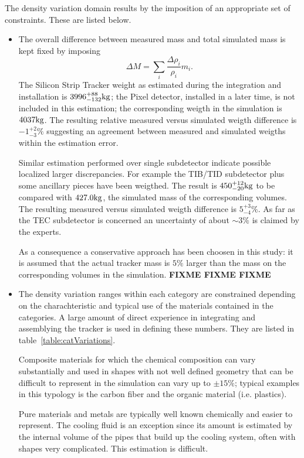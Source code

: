 \documentclass{cmspaper}
\begin{document}
The density variation domain results by the imposition of an appropriate set of constraints. These are listed below.
\begin{itemize}
%
\item The overall difference between measured mass and total simulated mass is kept fixed by imposing
 \begin{equation}
\Delta M = \sum_i \frac{\Delta \rho_i}{\rho_i} m_i.
\end{equation}
The Silicon Strip Tracker weight as estimated during the integration and installation is $3996^{+88}_{-132}\rm kg$; the Pixel detector, installed in a later time, is not included in this estimation; the corresponding weigth in the simulation is $4037\rm kg$. The resulting relative measured versus simulated weigth difference is $-1^{+2}_{-3}\%$ suggesting an agreement between measured and simulated weigths within the estimation error.


Similar estimation performed over single subdetector indicate possible localized larger discrepancies. For example the TIB/TID subdetector plus some ancillary pieces have been weigthed. The result is $450^{+12}_{-20}\rm kg$ to be compared with $427.0\rm kg$, the simulated mass of the corresponding volumes. The resulting measured versus simulated weigth difference is $5^{+3}_{-4}\%$. As far as the TEC subdetector is concerned an uncertainty of about $\sim 3\%$ is claimed by the experts.

As a consequence a conservative approach has been choosen in this study: it is assumed that the actual tracker mass is $5\%$ larger than the mass on the corresponding volumes in the simulation. {\bf FIXME FIXME FIXME}
\item The density variation ranges within each category are constrained depending on the charachteristic and typical use of the materials contained in the categories. A large amount of direct experience in integrating and assemblying the tracker is used in defining these numbers. They are listed in table~\ref{table:catVariations}.

Composite materials for which the chemical composition can vary substantially and used in shapes with not well defined geometry that can be difficult to represent in the simulation can vary up to $\pm 15\%$; typical examples in this typology is the carbon fiber and the organic material (i.e. plastics).

Pure materials and metals are typically well known chemically and easier to represent. The cooling fluid is an exception since its amount is estimated by the internal volume of the pipes that build up the cooling system, often with shapes very complicated. This estimation is difficult.


\end{itemize}
\end{document}
